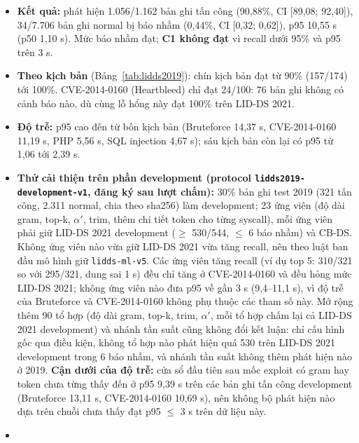 \begin{itemize}
\tightlist
\item
  \textbf{Kết quả:} phát hiện 1.056/1.162 bản ghi tấn công (90,88\%, CI {[}89,08; 92,40{]}), 34/7.706 bản ghi normal bị báo nhầm (0,44\%, CI {[}0,32; 0,62{]}), p95 10,55 s (p50 1,10 s). Mức báo nhầm đạt; \textbf{C1 không đạt} vì recall dưới 95\% và p95 trên 3 s.
\item
  \textbf{Theo kịch bản} (Bảng~\ref{tab:lidds2019}): chín kịch bản đạt từ 90\% (157/174) tới 100\%. CVE-2014-0160 (Heartbleed) chỉ đạt 24/100: 76 bản ghi không có cảnh báo nào, dù cùng lỗ hổng này đạt 100\% trên LID-DS 2021.
\item
  \textbf{Độ trễ:} p95 cao đến từ bốn kịch bản (Bruteforce 14,37 s, CVE-2014-0160 11,19 s, PHP 5,56 s, SQL injection 4,67 s); sáu kịch bản còn lại có p95 từ 1,06 tới 2,39 s.
\item
  \textbf{Thử cải thiện trên phần development (protocol \texttt{lidds2019-\allowbreak{}development-\allowbreak{}v1}, đăng ký sau lượt chấm):} 30\% bản ghi test 2019 (321 tấn công, 2.311 normal, chia theo sha256) làm development; 23 ứng viên (độ dài gram, top-k, $\alpha'$, trim, thêm chi tiết token cho từng syscall), mỗi ứng viên phải giữ LID-DS 2021 development ($\geq$ 530/544, $\leq$ 6 báo nhầm) và CB-DS. Không ứng viên nào vừa giữ LID-DS 2021 vừa tăng recall, nên theo luật ban đầu mô hình giữ \texttt{lidds-\allowbreak{}ml-\allowbreak{}v5}. Các ứng viên tăng recall (ví dụ top 5: 310/321 so với 295/321, dung sai 1 s) đều chỉ tăng ở CVE-2014-0160 và đều hỏng mức LID-DS 2021; không ứng viên nào đưa p95 về gần 3 s (9,4--11,1 s), vì độ trễ của Bruteforce và CVE-2014-0160 không phụ thuộc các tham số này. Mở rộng thêm 90 tổ hợp (độ dài gram, top-k, trim, $\alpha'$, mỗi tổ hợp chấm lại cả LID-DS 2021 development) và nhánh tần suất cũng không đổi kết luận: chỉ cấu hình gốc qua điều kiện, không tổ hợp nào phát hiện quá 530 trên LID-DS 2021 development trong 6 báo nhầm, và nhánh tần suất không thêm phát hiện nào ở 2019. \textbf{Cận dưới của độ trễ:} cửa sổ đầu tiên sau mốc exploit có gram hay token chưa từng thấy đến ở p95 9,39 s trên các bản ghi tấn công development (Bruteforce 13,11 s, CVE-2014-0160 10,69 s), nên không bộ phát hiện nào dựa trên chuỗi chưa thấy đạt p95 $\leq$ 3 s trên dữ liệu này.
\item

\end{itemize}
